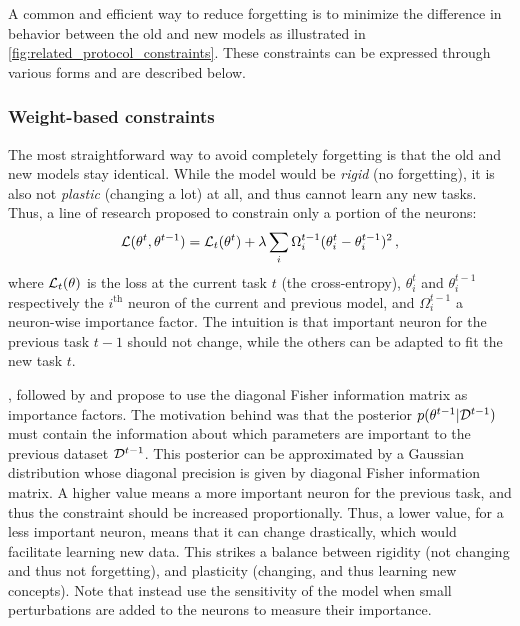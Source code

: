 A common and efficient way to reduce forgetting is to minimize the difference in behavior between
the old and new models as illustrated in \autoref{fig:related_protocol_constraints}. These constraints can be
expressed through various forms and are described below.

\subsubsection{Weight-based constraints}
\label{sec:related_regul_weight}


The most straightforward way to avoid completely forgetting is that the old and new models stay
identical. While the model would be \textit{rigid} (no forgetting), it is also not \textit{plastic}
(changing a lot) at all, and thus cannot learn any new tasks. Thus, a line of research proposed to
constrain only a portion of the neurons:
%
\begin{equation}
      \mathcal{L}(\theta^t, \theta^{t-1}) = \mathcal{L}_t(\theta^t) + \lambda \sum_i \Omega_i^{t-1} (\theta^t_i - \theta_i^{t-1})^2\,,
      \label{eq:related_weight_constraint}
\end{equation}
%
where $\mathcal{L}_t(\theta)$ is the loss at the current task $t$ (\eg the cross-entropy), $\theta_i^t$
and $\theta_i^{t-1}$ respectively the $i^\text{th}$ neuron of the current and previous model, and
$\Omega_i^{t-1}$ a neuron-wise importance factor. The intuition is that important neuron for the
previous task $t-1$ should not change, while the others can be adapted to fit the new task $t$.

\citet{kirkpatrick2017ewc}, followed by \citet{zenke2017synaptic_intelligence} and
\citet{chaudhry2018riemannien_walk} propose to use the diagonal Fisher information matrix as
importance factors. The motivation behind was that the posterior $p(\theta^{t-1} | \mathcal{D}^{t-1})$ must
contain the information about which parameters are important to the previous dataset $\mathcal{D}^{t-1}$.
This posterior can be approximated by a Gaussian distribution whose diagonal precision is given by
diagonal Fisher information matrix. A higher value means a more important neuron for the previous
task, and thus the constraint should be increased proportionally. Thus, a lower value, for a less
important neuron, means that it can change drastically, which would facilitate learning new data.
This strikes a balance between rigidity (not changing and thus not forgetting), and plasticity
(changing, and thus learning new concepts). Note that \citet{aljundi2018MemoryAwareSynapses} instead
use the sensitivity of the model when small perturbations are added to the neurons to measure their
importance.

